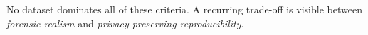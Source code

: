 


    


No dataset dominates all of these criteria. A recurring trade-off is visible between \emph{forensic realism} and \emph{privacy-preserving reproducibility}. 


